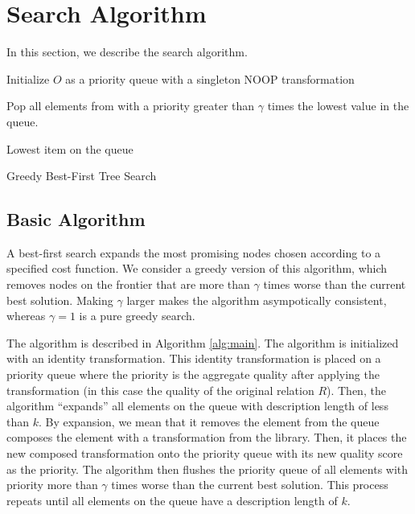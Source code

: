 \section{Search Algorithm}
In this section, we describe the search algorithm.

\begin{algorithm}[t]

Initialize $O$ as a priority queue with a singleton NOOP transformation\\

{
    
    Pop all elements from with a priority greater than $\gamma$ times the lowest value in the queue.
}

\Return Lowest item on the queue
\caption{Greedy Best-First Tree Search}
\label{alg:main}
\end{algorithm}


\subsection{Basic Algorithm}
A best-first search expands the most promising nodes chosen according to a specified cost function.
We consider a greedy version of this algorithm, which removes nodes on the frontier that are more than $\gamma$ times worse than the current best solution.
Making $\gamma$ larger makes the algorithm asympotically consistent, whereas $\gamma=1$ is a pure greedy search.

The algorithm is described in Algorithm \ref{alg:main}.
The algorithm is initialized with an identity transformation. This identity transformation is placed on a priority queue where the priority is the aggregate quality after applying the transformation (in this case the quality of the original relation $R$).
Then, the algorithm ``expands'' all elements on the queue with description length of less than $k$.
By expansion, we mean that it removes the element from the queue composes the element with a transformation from the library.
Then, it places the new composed transformation onto the priority queue with its new quality score as the priority.
The algorithm then flushes the priority queue of all elements with priority more than $\gamma$ times worse than the current best solution.
This process repeats until all elements on the queue have a description length of $k$.

